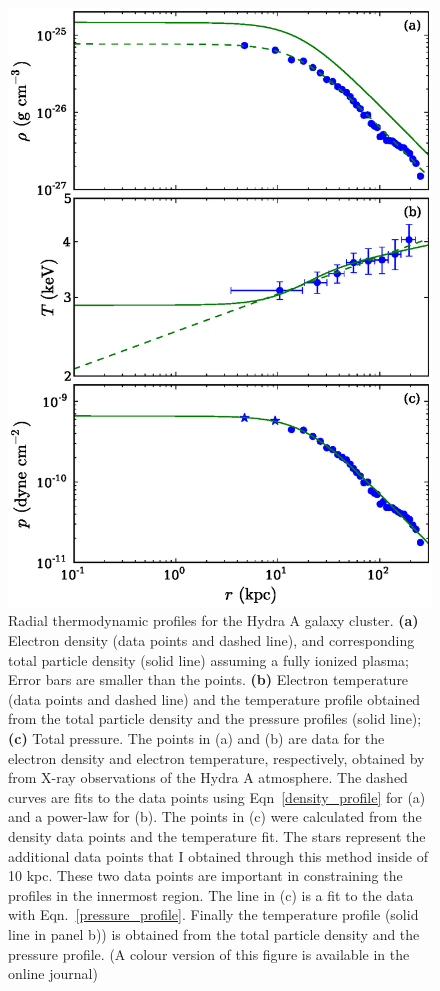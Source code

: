 \begin{figure}
\centering
\includegraphics[width=130mm]{ICM.eps}
\caption{Radial thermodynamic profiles for the Hydra A galaxy cluster. \textbf{(a)} Electron density (data points and dashed line), and corresponding total particle density (solid line) assuming a fully ionized plasma; Error bars are smaller than the points. \textbf{(b)} Electron temperature (data points and dashed line) and the temperature profile obtained from the total particle density and the pressure profiles (solid line); \textbf{(c)} Total pressure. The points in (a) and (b) are data for the electron density and electron temperature, respectively, obtained by \citet{david01} from X-ray observations of the Hydra A atmosphere. The dashed curves are fits to the data points using Eqn~\ref{density_profile} for (a) and a power-law for (b). The points in (c) were calculated from the density data points and the temperature fit. The stars represent the additional data points that I obtained through this method inside of 10 kpc. These two data points are important in constraining the profiles in the innermost region. The line in (c) is a fit to the data with Eqn.~\eqref{pressure_profile}.
Finally the temperature profile (solid line in panel b)) is obtained from the total particle density and the pressure profile. \newline
(A colour version of this figure is available in the online journal)}
\label{profiles}
\end{figure}



